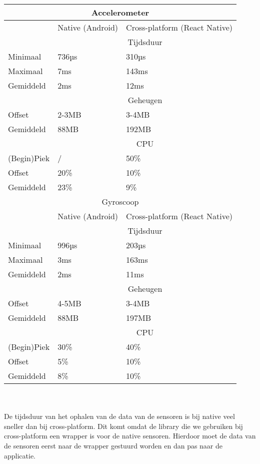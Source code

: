 \begin{tabular}{ |p{3cm}||p{5cm}|p{5cm}| }
    \hline
    \multicolumn{3}{|c|}{Accelerometer} \\ 
    \hline
     & Native (Android) & Cross-platform (React Native) \\
    \hline
     & \multicolumn{2}{|c|}{Tijdsduur} \\
    \hline
    Minimaal & 736µs & 310µs \\
    Maximaal & 7ms & 143ms \\
    Gemiddeld & 2ms & 12ms \\
    \hline
     & \multicolumn{2}{|c|}{Geheugen} \\ 
    \hline
    Offset & 2-3MB & 3-4MB \\
    Gemiddeld & 88MB & 192MB \\
    \hline
     & \multicolumn{2}{|c|}{CPU} \\
    \hline
    (Begin)Piek & / & 50\% \\
    Offset & 20\% & 10\% \\
    Gemiddeld & 23\% & 9\% \\
    \hline
    \multicolumn{3}{|c|}{Gyroscoop} \\ 
    \hline
     & Native (Android) & Cross-platform (React Native) \\
    \hline
     & \multicolumn{2}{|c|}{Tijdsduur} \\
    \hline
    Minimaal & 996µs & 203µs \\
    Maximaal & 3ms & 163ms \\
    Gemiddeld & 2ms & 11ms \\
    \hline
     & \multicolumn{2}{|c|}{Geheugen} \\ 
    \hline
    Offset & 4-5MB & 3-4MB \\
    Gemiddeld & 88MB & 197MB \\
    \hline
     & \multicolumn{2}{|c|}{CPU} \\
    \hline
    (Begin)Piek & 30\% & 40\% \\
    Offset & 5\% & 10\% \\
    Gemiddeld & 8\% & 10\% \\
    \hline
\end{tabular}
\\\\
De tijdsduur van het ophalen van de data van de sensoren is bij native veel sneller dan bij cross-platform.
Dit komt omdat de library die we gebruiken bij cross-platform een wrapper is voor de native sensoren.
Hierdoor moet de data van de sensoren eerst naar de wrapper gestuurd worden en dan pas naar de applicatie.
